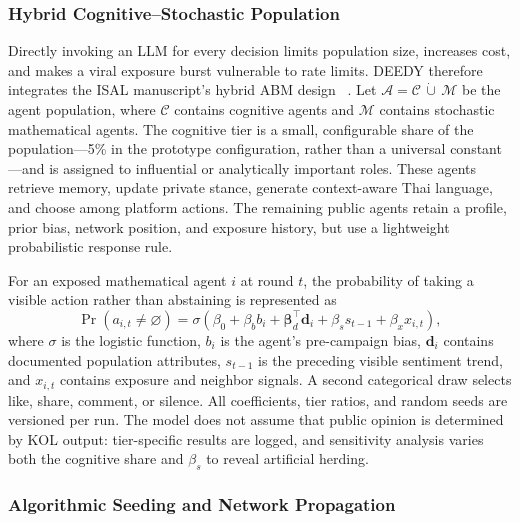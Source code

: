 \documentclass[conference]{IEEEtran}
\begin{document}
\subsubsection{Hybrid Cognitive--Stochastic Population}

Directly invoking an LLM for every decision limits population size, increases
cost, and makes a viral exposure burst vulnerable to rate limits. DEEDY
therefore integrates the ISAL manuscript's hybrid ABM design
~\cite{marketfish2026architecture}. Let
$\mathcal{A}=\mathcal{C}\,\dot\cup\,\mathcal{M}$ be the agent population, where
$\mathcal{C}$ contains cognitive agents and $\mathcal{M}$ contains stochastic
mathematical agents. The cognitive tier is a small, configurable share of the
population---5\% in the prototype configuration, rather than a universal
constant---and is assigned to influential or analytically important roles.
These agents retrieve memory, update private stance, generate context-aware
Thai language, and choose among platform actions. The remaining public agents
retain a profile, prior bias, network position, and exposure history, but use a
lightweight probabilistic response rule.

For an exposed mathematical agent $i$ at round $t$, the probability of taking
a visible action rather than abstaining is represented as
\begin{equation}
    \Pr(a_{i,t}\neq\varnothing)=\sigma\!\left(
    \beta_0 + \beta_b b_i + \boldsymbol{\beta}_d^{\top}\mathbf{d}_i
    + \beta_s s_{t-1} + \beta_x x_{i,t}\right),
    \label{eq:hybrid-response}
\end{equation}
where $\sigma$ is the logistic function, $b_i$ is the agent's pre-campaign
bias, $\mathbf{d}_i$ contains documented population attributes, $s_{t-1}$ is
the preceding visible sentiment trend, and $x_{i,t}$ contains exposure and
neighbor signals. A second categorical draw selects like, share, comment, or
silence. All coefficients, tier ratios, and random seeds are versioned per run.
The model does not assume that public opinion is determined by KOL output:
tier-specific results are logged, and sensitivity analysis varies both the
cognitive share and $\beta_s$ to reveal artificial herding.

\subsubsection{Algorithmic Seeding and Network Propagation}
\end{document}
